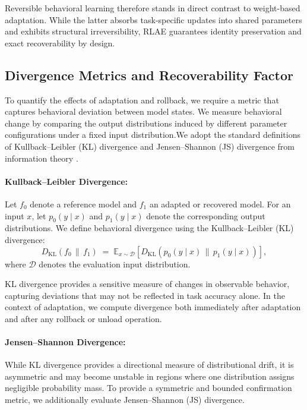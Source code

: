\documentclass{article}
\begin{document}
	Reversible behavioral learning therefore stands in direct contrast to weight-based adaptation. While the latter absorbs task-specific updates into shared parameters and exhibits structural irreversibility, RLAE guarantees identity preservation and exact recoverability by design.
	
	
	\subsection{Divergence Metrics and Recoverability Factor}
	\label{sec:kl_rf}
	
	To quantify the effects of adaptation and rollback, we require a metric that captures behavioral deviation between model states. We measure behavioral change by comparing the output distributions induced by different parameter configurations under a fixed input distribution.We adopt the standard definitions of Kullback–Leibler (KL) divergence and Jensen–Shannon (JS) divergence from information theory \cite{kullback1951information, lin1991divergence, cover2006elements}.
	
	\paragraph{Kullback--Leibler Divergence:}
	
	Let $f_0$ denote a reference model and $f_1$ an adapted or recovered model. For an input $x$, let $p_0(y \mid x)$ and $p_1(y \mid x)$ denote the corresponding output distributions. We define behavioral divergence using the Kullback--Leibler (KL) divergence:
	\[
	D_{\mathrm{KL}}(f_0 \,\|\, f_1)
	\;=\;
	\mathbb{E}_{x \sim \mathcal{D}}
	\left[
	D_{\mathrm{KL}}\!\left(p_0(y \mid x) \,\|\, p_1(y \mid x)\right)
	\right],
	\]
	where $\mathcal{D}$ denotes the evaluation input distribution.
	
	KL divergence provides a sensitive measure of changes in observable behavior, capturing deviations that may not be reflected in task accuracy alone. In the context of adaptation, we compute divergence both immediately after adaptation and after any rollback or unload operation.
	
	\paragraph{Jensen--Shannon Divergence:}
	
	While KL divergence provides a directional measure of distributional drift, it is asymmetric and may become unstable in regions where one distribution assigns negligible probability mass. To provide a symmetric and bounded confirmation metric, we additionally evaluate Jensen--Shannon (JS) divergence.
	
\end{document}
